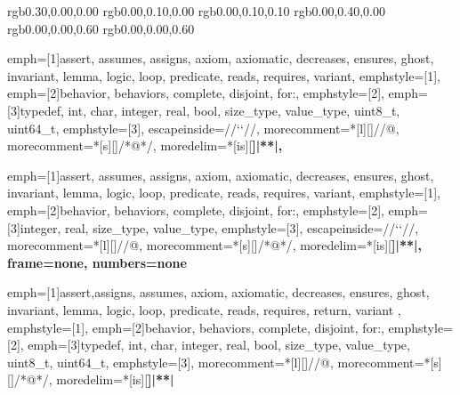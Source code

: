 
\usepackage{courier} 
\usepackage{listings}
\usepackage{color} 


\definecolor{coACSLBehavior}	{rgb}{0.30,0.00,0.00}
\definecolor{coASCL}		{rgb}{0.00,0.10,0.00}
\definecolor{coASCLKeyword}	{rgb}{0.00,0.10,0.10}
\definecolor{darkgreen}		{rgb}{0.00,0.40,0.00}
\definecolor{darkblue}		{rgb}{0.00,0.00,0.60}
\definecolor{coCKeyword}	{rgb}{0.00,0.00,0.60}

{	emph=[1]{assert, assumes, assigns, axiom, axiomatic, decreases, ensures,
                 ghost, invariant, lemma, logic, loop, predicate,
		 reads, requires, variant},
	emphstyle=[1]{\bfseries\color{coASCLKeyword}},
	emph=[2]{behavior, behaviors, complete, disjoint, for:},
	emphstyle=[2]{\bfseries\color{coACSLBehavior}},
	emph=[3]{typedef, int, char, integer, real, bool, size_type, value_type, uint8_t,  uint64_t},
	emphstyle=[3]{\bfseries\color{coCKeyword}},
	escapeinside={//`}{`//},
	morecomment=*[l][\color{coASCL}]{//@},
	morecomment=*[s][\color{coASCL}]{/*@}{*/},
	moredelim=*[is][\bfseries]{|*}{*|},
	}

{	emph=[1]{assert, assumes, assigns, axiom, axiomatic, decreases, ensures,
                 ghost, invariant, lemma, logic, loop, predicate,
		 reads, requires, variant},
	emphstyle=[1]{\bfseries\color{coASCLKeyword}},
	emph=[2]{behavior, behaviors, complete, disjoint, for:},
	emphstyle=[2]{\bfseries\color{coACSLBehavior}},
	emph=[3]{integer, real, size_type, value_type},
	emphstyle=[3]{\bfseries\color{coCKeyword}},
	escapeinside={//`}{`//},
	morecomment=*[l][\color{coASCL}]{//@},
	morecomment=*[s][\color{coASCL}]{/*@}{*/},
	moredelim=*[is][\bfseries]{|*}{*|},
    frame=none,
    numbers=none
	}

{	emph=[1]{assert,assigns, assumes, axiom, axiomatic, decreases, ensures, ghost, invariant, lemma, logic, loop,
             predicate, reads, requires, return, variant },
	emphstyle=[1]{\bfseries\color{coASCLKeyword}},
	emph=[2]{behavior, behaviors, complete, disjoint, for:},
	emphstyle=[2]{\bfseries\color{coACSLBehavior}},
	emph=[3]{typedef, int, char, integer, real, bool, size_type, value_type, uint8_t,  uint64_t},
	emphstyle=[3]{\bfseries\color{coCKeyword}},
	morecomment=*[l][\color{coASCL}]{//@},
	morecomment=*[s][\color{coASCL}]{/*@}{*/},
	moredelim=*[is][\bfseries]{|*}{*|}
}

